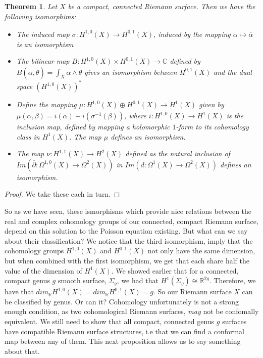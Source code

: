 \documentclass[11pt]{report}
\newtheorem{thm}{Theorem}[section]
\theoremstyle{definition}
\begin{document}
\begin{thm}
  Let $X$ be a compact, connected Riemann surface. Then we have the following isomorphims:
  \begin{itemize}
    \item The induced map $\sigma: H^{1,0}(X) \rightarrow \overline{H^{0,1}}(X)$, induced by the mapping $\alpha \mapsto \overline{\alpha}$ is an isomorphism
    \item The bilinear map $B:H^{1,0}(X)\times H^{0,1}(X) \rightarrow \mathbb{C}$ defined by $B(\alpha, \tilde{\theta})=\int_X \alpha \wedge \theta$ gives an isomorphism between $H^{0,1}(X)$ and the dual space $(H^{1,0}(X))^*$
    \item Define the mapping $\mu:H^{1,0}(X) \oplus H^{0,1}(X) \rightarrow H^1(X)$ given by $\mu(\alpha, \beta) = i(\alpha) + \overline{i(\sigma^{-1}(\beta))}$, where $i:H^{1,0}(X) \rightarrow H^1(X)$ is the inclusion map, defined by mapping a holomorphic $1$-form to its cohomology class in $H^1(X)$. The map $\mu$ defines an isomorphism.
    \item The map $\nu:H^{1,1}(X) \rightarrow H^2(X)$ defined as the natural inclusion of $Im(\overline{\partial}:\Omega^{1,0}(X)\rightarrow \Omega^2(X))$ in $Im(d:\Omega^1(X)\rightarrow \Omega^2(X))$ defines an isomorphism.
  \end{itemize}
\end{thm}
\begin{proof}
  We take these each in turn.
\end{proof}
So as we have seen, these ismorphisms which provide nice relations between the real and complex cohomology groups of our connected, compact Riemann surface, depend on this solution to the Poisson equation existing. But what can we say about their classification? We notice that the third isomorphism, imply that the cohomology groups $H^{1,0}(X)$ and $H^{0,1}(X)$ not only have the same dimension, but when combined with the first isomorphism, we get that each share half the value of the dimension of $H^1(X)$. We showed earlier that for a connected, compact genus $g$ smooth surface, $\Sigma_g$, we had that $H^1(\Sigma_g)\cong\mathbb{R}^{2g}$. Therefore, we have that $dim_{\mathbb{R}}H^{1,0}(X)=dim_{\mathbb{R}}H^{0,1}(X)=g$. So our Riemann surface $X$ can be classified by genus. Or can it? Cohomology unfortunately is not a strong enough condition, as two cohomological Riemann surfaces, \emph{may} not be confomally equivalent. We still need to show that all compact, connected genus $g$ surfaces have compatible Riemann surface structures, i.e that we can find a conformal map between any of them. This next proposition allows us to say something about that.
\end{document}
